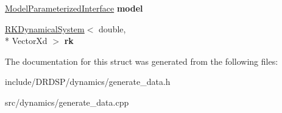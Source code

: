 \begin{DoxyCompactItemize}
\item 
\hypertarget{struct_d_r_d_s_p_1_1_data_generator_adcfa6b6a64dd3da8544234dac3585be8}{\hyperlink{struct_d_r_d_s_p_1_1_model_parameterized_interface}{Model\-Parameterized\-Interface} {\bfseries model}}\label{struct_d_r_d_s_p_1_1_data_generator_adcfa6b6a64dd3da8544234dac3585be8}

\item 
\hypertarget{struct_d_r_d_s_p_1_1_data_generator_a158608e79fdaecc9037fa16f0efe1a16}{\hyperlink{struct_d_r_d_s_p_1_1_r_k_dynamical_system}{R\-K\-Dynamical\-System}$<$ double, \\*
Vector\-Xd $>$ {\bfseries rk}}\label{struct_d_r_d_s_p_1_1_data_generator_a158608e79fdaecc9037fa16f0efe1a16}

\end{DoxyCompactItemize}


The documentation for this struct was generated from the following files\-:\begin{DoxyCompactItemize}
\item 
include/\-D\-R\-D\-S\-P/dynamics/generate\-\_\-data.\-h\item 
src/dynamics/generate\-\_\-data.\-cpp\end{DoxyCompactItemize}
